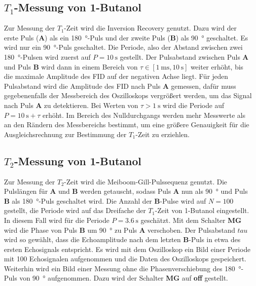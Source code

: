 \subsection{$T_1$-Messung von 1-Butanol}
Zur Messung der $T_1$-Zeit wird die Inversion Recovery genutzt.
Dazu wird der erste Puls (\textbf{A}) als ein \SI{180}{\degree}-Puls und der zweite Puls (\textbf{B}) als \SI{90}{\degree} geschaltet.
Es wird nur ein \SI{90}{\degree}-Puls geschaltet.
Die Periode, also der Abstand zwischen zwei \SI{180}{\degree}-Pulsen wird zuerst auf $P=\SI{10}{\second}$ gestellt.
Der Pulsabstand \tau zwischen Puls \textbf{A} und Puls \textbf{B} wird dann in einem Bereich von $\tau \in [\SI{1}{\milli\second}, \SI{10}{\second}]$ weiter erhöht, bis die maximale Amplitude des FID auf der negativen Achse liegt.
Für jeden Pulsabstand wird die Amplitude des FID nach Puls \textbf{A} gemessen, dafür muss gegebenenfalls der Messbereich des Oszilloskops vergrößert werden, um das Signal nach Puls \textbf{A} zu detektieren.
Bei Werten von $\tau > \SI{1}{\second}$ wird die Periode auf $ P =\SI{10}{\second} + \tau$ erhöht.
Im Bereich des Nulldurchgangs werden mehr Messwerte als an den Rändern des Messbereichs bestimmt, um eine größere Genauigkeit für die Ausgleichsrechnung zur Bestimmung der $T_1$-Zeit zu erziehlen.


\subsection{$T_2$-Messung von 1-Butanol}
Zur Messung der $T_2$-Zeit wird die Meiboom-Gill-Pulssequenz genutzt.
Die Pulslängen für \textbf{A} und \textbf{B} werden getauscht, sodass Puls \textbf{A} nun als \SI{90}{\degree} und Puls \textbf{B} als \SI{180}{\degree}-Puls geschaltet wird.
Die Anzahl der \textbf{B}-Pulse wird auf $N=100$ gestellt, die Periode wird auf das Dreifache der $T_1$-Zeit von 1-Butanol eingestellt.
In diesem Fall wird für die Periode $P = \SI{3.6}{\second}$ geschätzt.
Mit dem Schalter \textbf{MG} wird die Phase von Puls \textbf{B} um \SI{90}{\degree} zu Puls \textbf{A} verschoben.
Der Pulsabstand $tau$ wird so gewählt, dass die Echoamplitude nach dem letzten \textbf{B}-Puls in etwa  des ersten Echosignals entspricht.
Es wird mit dem Oszilloskop ein Bild einer Periode mit 100 Echosignalen aufgenommen und die Daten des Oszilloskops gespeichert.
Weiterhin wird ein Bild einer Messung ohne die Phasenverschiebung des \SI{180}{\degree}-Puls von \SI{90}{\degree} aufgenommen. Dazu wird der Schalter \textbf{MG} auf \textbf{off} gestellt.

